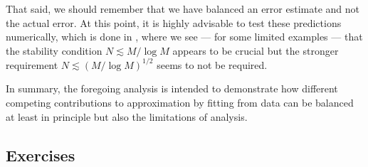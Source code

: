 That said, we should remember that we have balanced an error estimate and not
the actual error. At this point, it is highly advisable to test these
predictions numerically, which is done in \nblsq, where we see --- for some
limited examples --- that the stability condition $N \lesssim M/\log M$ appears
to be crucial but the stronger requirement $N \lesssim (M/\log M)^{1/2}$ seems
to not be required.

In summary, the foregoing analysis is intended to demonstrate how different
competing contributions to approximation by fitting from data can be balanced at
least in principle but also the limitations of analysis.





\subsection{Exercises}
%
\label{sec:lsq:exercises}
%
